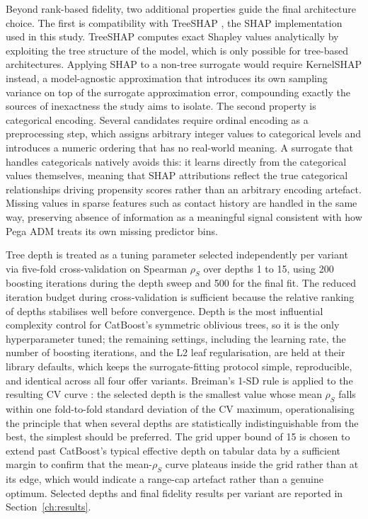 \documentclass[oneside]{memoir} %
\begin{document}
Beyond rank-based fidelity, two additional properties guide the final architecture choice. The first is compatibility with TreeSHAP \parencite{lundberg_local_2020}, the SHAP implementation used in this study. TreeSHAP computes exact Shapley values analytically by exploiting the tree structure of the model, which is only possible for tree-based architectures. Applying SHAP to a non-tree surrogate would require KernelSHAP instead, a model-agnostic approximation that introduces its own sampling variance on top of the surrogate approximation error, compounding exactly the sources of inexactness the study aims to isolate. The second property is categorical encoding. Several candidates require ordinal encoding as a preprocessing step, which assigns arbitrary integer values to categorical levels and introduces a numeric ordering that has no real-world meaning. A surrogate that handles categoricals natively avoids this: it learns directly from the categorical values themselves, meaning that SHAP attributions reflect the true categorical relationships driving propensity scores rather than an arbitrary encoding artefact. Missing values in sparse features such as contact history are handled in the same way, preserving absence of information as a meaningful signal consistent with how Pega ADM treats its own missing predictor bins.

Tree depth is treated as a tuning parameter selected independently per variant via five-fold cross-validation on Spearman $\rho_S$ over depths 1 to 15, using 200 boosting iterations during the depth sweep and 500 for the final fit. The reduced iteration budget during cross-validation is sufficient because the relative ranking of depths stabilises well before convergence. Depth is the most influential complexity control for CatBoost's symmetric oblivious trees, so it is the only hyperparameter tuned; the remaining settings, including the learning rate, the number of boosting iterations, and the L2 leaf regularisation, are held at their library defaults, which keeps the surrogate-fitting protocol simple, reproducible, and identical across all four offer variants. Breiman's 1-SD rule is applied to the resulting CV curve
\parencite{hastie_elements_2009}: the selected depth is the smallest value whose mean $\rho_S$
falls within one fold-to-fold standard deviation of the CV maximum, operationalising the principle that when several depths are statistically indistinguishable from the best, the simplest should be preferred. The grid upper bound of 15 is chosen to extend past CatBoost's typical effective depth on tabular data by a sufficient margin to confirm that the mean-$\rho_S$ curve plateaus inside the grid rather than at its edge, which would indicate a range-cap artefact rather than a genuine optimum. Selected depths and final fidelity results per variant are reported in Section~\ref{ch:results}.
\end{document}
